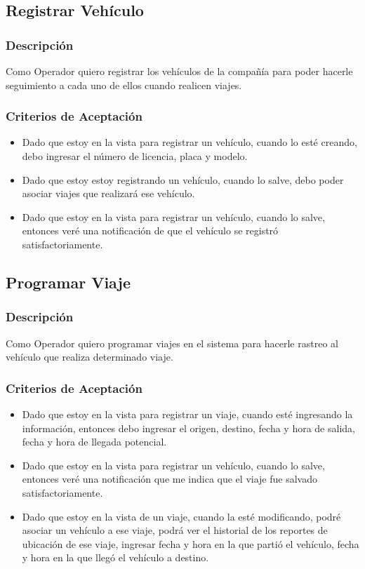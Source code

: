 \documentclass{article}
\begin{document}
\subsection{Registrar Vehículo}
\subsubsection{Descripción} 
Como Operador quiero registrar los vehículos de la compañía para poder hacerle seguimiento a cada uno de ellos cuando realicen viajes.
\subsubsection{Criterios de Aceptación}
\begin{itemize}
    \item Dado que estoy en la vista para registrar un vehículo, cuando lo esté creando, debo ingresar el número de licencia, placa y modelo.
    \item Dado que estoy estoy registrando un vehículo, cuando lo salve, debo poder asociar viajes que realizará ese vehículo.
    \item Dado que estoy en la vista para registrar un vehículo, cuando lo salve, entonces veré una notificación de que el vehículo se registró satisfactoriamente.
\end{itemize}

\subsection{Programar Viaje}
\subsubsection{Descripción}
Como Operador quiero programar viajes en el sistema para hacerle rastreo al vehículo que realiza determinado viaje.
\subsubsection{Criterios de Aceptación}
\begin{itemize}
    \item Dado que estoy en la vista para registrar un viaje, cuando esté ingresando la información, entonces debo ingresar el origen, destino, fecha y hora de salida, fecha y hora de llegada potencial.
    \item Dado que estoy en la vista para registrar un vehículo, cuando lo salve, entonces veré una notificación que me indica que el viaje fue salvado satisfactoriamente.
    \item Dado que estoy en la vista de un viaje, cuando la esté modificando, podré asociar un vehículo a ese viaje, podrá ver el historial de los reportes de ubicación de ese viaje, ingresar fecha y hora en la que partió el vehículo, fecha y hora en la que llegó el vehículo a destino.
\end{itemize}
\end{document}
